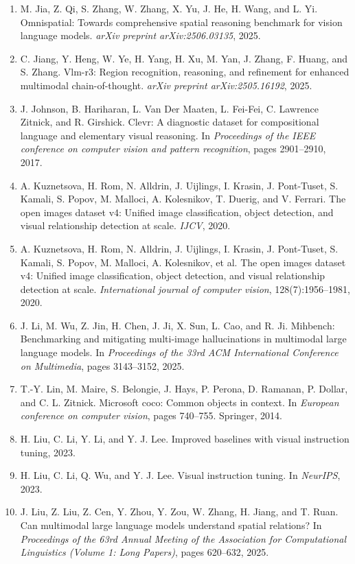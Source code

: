 \documentclass[11pt,a4paper]{article}
\begin{document}
\begin{enumerate}
    \item M. Jia, Z. Qi, S. Zhang, W. Zhang, X. Yu, J. He, H. Wang, and L. Yi. Omnispatial: Towards comprehensive spatial reasoning benchmark for vision language models. \textit{arXiv preprint arXiv:2506.03135}, 2025.
    \item C. Jiang, Y. Heng, W. Ye, H. Yang, H. Xu, M. Yan, J. Zhang, F. Huang, and S. Zhang. Vlm-r3: Region recognition, reasoning, and refinement for enhanced multimodal chain-of-thought. \textit{arXiv preprint arXiv:2505.16192}, 2025.
    \item J. Johnson, B. Hariharan, L. Van Der Maaten, L. Fei-Fei, C. Lawrence Zitnick, and R. Girshick. Clevr: A diagnostic dataset for compositional language and elementary visual reasoning. In \textit{Proceedings of the IEEE conference on computer vision and pattern recognition}, pages 2901–2910, 2017.
    \item A. Kuznetsova, H. Rom, N. Alldrin, J. Uijlings, I. Krasin, J. Pont-Tuset, S. Kamali, S. Popov, M. Malloci, A. Kolesnikov, T. Duerig, and V. Ferrari. The open images dataset v4: Unified image classification, object detection, and visual relationship detection at scale. \textit{IJCV}, 2020.
    \item A. Kuznetsova, H. Rom, N. Alldrin, J. Uijlings, I. Krasin, J. Pont-Tuset, S. Kamali, S. Popov, M. Malloci, A. Kolesnikov, et al. The open images dataset v4: Unified image classification, object detection, and visual relationship detection at scale. \textit{International journal of computer vision}, 128(7):1956–1981, 2020.
    \item J. Li, M. Wu, Z. Jin, H. Chen, J. Ji, X. Sun, L. Cao, and R. Ji. Mihbench: Benchmarking and mitigating multi-image hallucinations in multimodal large language models. In \textit{Proceedings of the 33rd ACM International Conference on Multimedia}, pages 3143–3152, 2025.
    \item T.-Y. Lin, M. Maire, S. Belongie, J. Hays, P. Perona, D. Ramanan, P. Dollar, and C. L. Zitnick. Microsoft coco: Common objects in context. In \textit{European conference on computer vision}, pages 740–755. Springer, 2014.
    \item H. Liu, C. Li, Y. Li, and Y. J. Lee. Improved baselines with visual instruction tuning, 2023.
    \item H. Liu, C. Li, Q. Wu, and Y. J. Lee. Visual instruction tuning. In \textit{NeurIPS}, 2023.
    \item J. Liu, Z. Liu, Z. Cen, Y. Zhou, Y. Zou, W. Zhang, H. Jiang, and T. Ruan. Can multimodal large language models understand spatial relations? In \textit{Proceedings of the 63rd Annual Meeting of the Association for Computational Linguistics (Volume 1: Long Papers)}, pages 620–632, 2025.

\end{enumerate}
\end{document}

